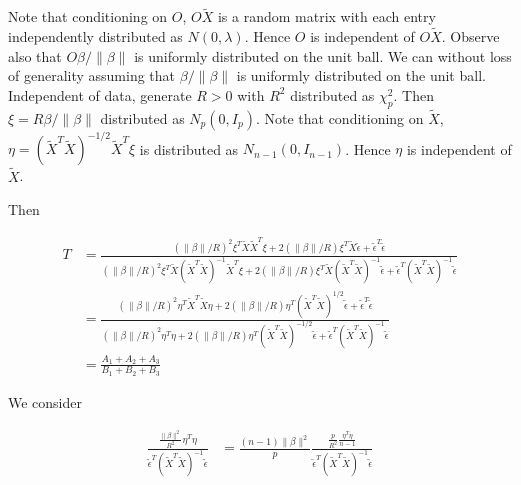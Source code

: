 \documentclass[review]{elsarticle}
\theoremstyle{plain}
\theoremstyle{definition}
\theoremstyle{remark}
\begin{document}
Note that conditioning on $O$, $O\tilde{X}$ is a random matrix with each entry independently distributed as $N(0,\lambda)$. Hence $O$ is independent of $O\tilde{X}$. Observe also that $O\beta/\|\beta\|$ is uniformly distributed on the unit ball.  We can without loss of generality assuming that $\beta/\|\beta\|$ is uniformly distributed on the unit ball. Independent of data, generate $R>0$ with $R^2$ distributed as $\chi^2_{p}$. Then $\xi=R\beta/\|\beta\|$ distributed as $N_p(0,I_p)$.
Note that conditioning on $\tilde{X}$, $\eta={(\tilde{X}^T\tilde{X})}^{-1/2}\tilde{X}^T \xi$ is distributed as $N_{n-1}(0,I_{n-1})$. Hence $\eta$ is independent of $\tilde{X}$.

Then

\begin{equation}
    \begin{aligned}
        T&=\frac{{(\|\beta\|/R)}^2\xi^T \tilde{X}\tilde{X}^T \xi+
        2(\|\beta\|/R)\xi^T \tilde{X}\tilde{\epsilon}+
        \tilde{\epsilon}^T\tilde{\epsilon}
    }{{(\|\beta\|/R)}^2\xi^T \tilde{X}{(\tilde{X}^T\tilde{X})}^{-1}\tilde{X}^T \xi+
        2(\|\beta\|/R)\xi^T \tilde{X}{(\tilde{X}^T\tilde{X})}^{-1}\tilde{\epsilon}+
        \tilde{\epsilon}^T{(\tilde{X}^T\tilde{X})}^{-1}\tilde{\epsilon}
    }\\
        &=
        \frac{{(\|\beta\|/R)}^2\eta^T \tilde{X}^T\tilde{X} \eta+
        2(\|\beta\|/R)\eta^T {(\tilde{X}^T\tilde{X})}^{1/2}\tilde{\epsilon}+
        \tilde{\epsilon}^T\tilde{\epsilon}
    }{{(\|\beta\|/R)}^2\eta^T\eta+
        2(\|\beta\|/R)\eta^T{(\tilde{X}^T\tilde{X})}^{-1/2}\tilde{\epsilon}+
        \tilde{\epsilon}^T{(\tilde{X}^T\tilde{X})}^{-1}\tilde{\epsilon}
    }\\
        &=\frac{A_1+A_2+A_3}{B_1+B_2+B_3}
    \end{aligned}
\end{equation}

We consider

\begin{equation}
    \begin{aligned}
    \frac{\frac{\|\beta\|^2}{R^2} \eta^T\eta
        }{\tilde{\epsilon}^T{(\tilde{X}^T\tilde{X})}^{-1}\tilde{\epsilon}}&=
        \frac{(n-1)\|\beta\|^2}{p}
        \frac{\frac{p}{R^2} \frac{\eta^T\eta}{n-1}
        }{\tilde{\epsilon}^T{(\tilde{X}^T\tilde{X})}^{-1}\tilde{\epsilon}}
    \end{aligned}
\end{equation}
\end{document}
